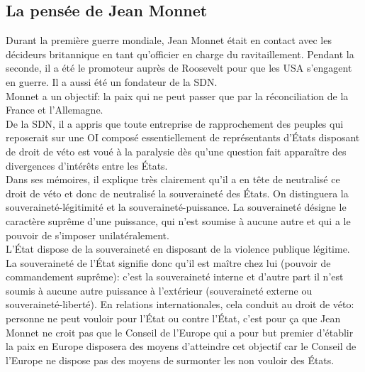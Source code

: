 \documentclass[12pt, a4paper, openany]{book}
\begin{document}
\subsection{La pensée de Jean Monnet}
Durant la première guerre mondiale, Jean Monnet était en contact avec les décideurs britannique en tant qu'officier en charge du ravitaillement. Pendant la seconde, il a été le promoteur auprès de Roosevelt pour que les USA s'engagent en guerre. Il a aussi été un fondateur de la SDN. \\
Monnet a un objectif: la paix qui ne peut passer que par la réconciliation de la France et l'Allemagne. \\
De la SDN, il a appris que toute entreprise de rapprochement des peuples qui reposerait sur une OI composé essentiellement de représentants d'États disposant de droit de véto est voué à la paralysie dès qu'une question fait apparaître des divergences d'intérêts entre les États. \\
Dans ses mémoires, il explique très clairement qu'il a en tête de neutralisé ce droit de véto et donc de neutralisé la souveraineté des États. On distinguera la souveraineté-légitimité et la souveraineté-puissance. La souveraineté désigne le caractère suprême d'une puissance, qui n'est soumise à aucune autre et qui a le pouvoir de s'imposer unilatéralement. \\
L'État dispose de la souveraineté en disposant de la violence publique légitime. La souveraineté de l'État signifie donc qu'il est maître chez lui (pouvoir de commandement suprême): c'est la souveraineté interne et d'autre part il n'est soumis à aucune autre puissance à l'extérieur (souveraineté externe ou souveraineté-liberté). En relations internationales, cela conduit au droit de véto: personne ne peut vouloir pour l'État ou contre l'État, c'est pour ça que Jean Monnet ne croit pas que le Conseil de l'Europe qui a pour but premier d'établir la paix en Europe disposera des moyens d'atteindre cet objectif car le Conseil de l'Europe ne dispose pas des moyens de surmonter les non vouloir des États.
\end{document}
